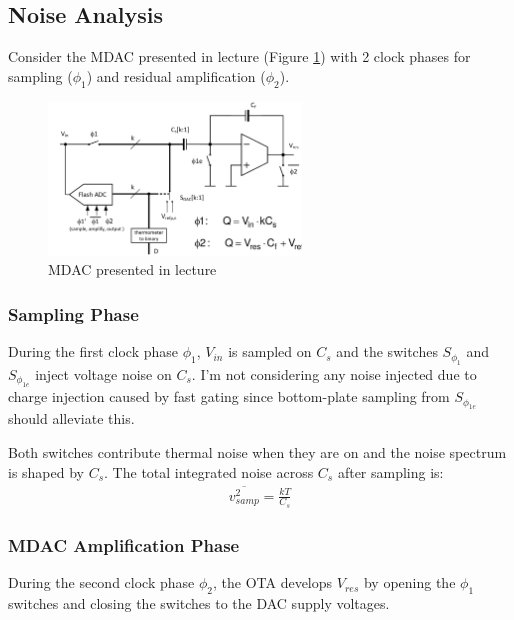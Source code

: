 \documentclass[11pt]{article}
\begin{document}
\subsection{Noise Analysis}
Consider the MDAC presented in lecture (Figure \ref{fig:mdac}) with 2 clock phases for sampling ($\phi_1$) and residual amplification ($\phi_2$).

\begin{figure}[h]
  \centering
  \includegraphics[width=0.6\textwidth]{figs/mdac.png}
  \caption{MDAC presented in lecture}
  \label{fig:mdac}
\end{figure}

\subsubsection{Sampling Phase}
During the first clock phase $\phi_1$, $V_{in}$ is sampled on $C_{s}$ and the switches $S_{\phi_1}$ and $S_{\phi_{1e}}$ inject voltage noise on $C_s$.
I'm not considering any noise injected due to charge injection caused by fast gating since bottom-plate sampling from $S_{\phi_{1e}}$ should alleviate this.

Both switches contribute thermal noise when they are on and the noise spectrum is shaped by $C_s$.
The total integrated noise across $C_s$ after sampling is:
\begin{align*}
  \overline{v^2_{samp}} = \frac{kT}{C_s}
\end{align*}

\subsubsection{MDAC Amplification Phase} %
During the second clock phase $\phi_2$, the OTA develops $V_{res}$ by opening the $\phi_1$ switches and closing the switches to the DAC supply voltages.
\end{document}
